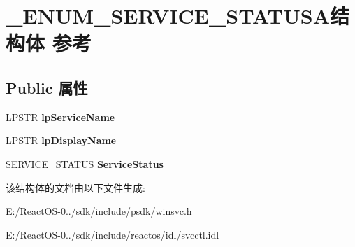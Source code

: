 \hypertarget{struct___e_n_u_m___s_e_r_v_i_c_e___s_t_a_t_u_s_a}{}\section{\+\_\+\+E\+N\+U\+M\+\_\+\+S\+E\+R\+V\+I\+C\+E\+\_\+\+S\+T\+A\+T\+U\+S\+A结构体 参考}
\label{struct___e_n_u_m___s_e_r_v_i_c_e___s_t_a_t_u_s_a}
\subsection*{Public 属性}
\begin{DoxyCompactItemize}
\item 
\mbox{\label{struct___e_n_u_m___s_e_r_v_i_c_e___s_t_a_t_u_s_a_a872c4c7c965db82884eb96e67e969329}} 
L\+P\+S\+TR {\bfseries lp\+Service\+Name}
\item 
\mbox{\label{struct___e_n_u_m___s_e_r_v_i_c_e___s_t_a_t_u_s_a_aa62958def0ccf94ca5823284a2d51b73}} 
L\+P\+S\+TR {\bfseries lp\+Display\+Name}
\item 
\mbox{\label{struct___e_n_u_m___s_e_r_v_i_c_e___s_t_a_t_u_s_a_af2b0dfedba1ec6282e292ca9d55f75b5}} 
\hyperlink{struct___s_e_r_v_i_c_e___s_t_a_t_u_s}{S\+E\+R\+V\+I\+C\+E\+\_\+\+S\+T\+A\+T\+US} {\bfseries Service\+Status}
\end{DoxyCompactItemize}


该结构体的文档由以下文件生成\+:\begin{DoxyCompactItemize}
\item 
E\+:/\+React\+O\+S-\/0../sdk/include/psdk/winsvc.\+h\item 
E\+:/\+React\+O\+S-\/0../sdk/include/reactos/idl/svcctl.\+idl\end{DoxyCompactItemize}
